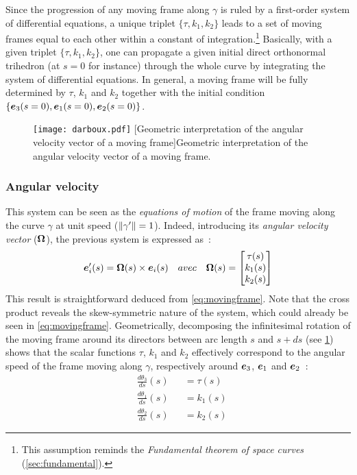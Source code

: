 Since the progression of any moving frame along $\gamma$ is ruled by a first-order system of differential equations, a unique triplet $\{\tau, k_{1}, k_{2}\}$ leads to a set of moving frames equal to each other within a constant of integration.\footnote{This assumption reminds the \emph{Fundamental theorem of space curves} (\cref{sec:fundamental}).} Basically, with a given triplet $\{\tau, k_{1}, k_{2}\}$, one can propagate a given initial direct orthonormal trihedron (at $s=0$ for instance) through the whole curve by integrating the system of differential equations. In general, a moving frame will be fully determined by $\tau$, $k_{1}$ and $k_{2}$ together with the initial condition $\{\boldsymbol{e}_{3}(s=0),\boldsymbol{e}_{1}(s=0),\boldsymbol{e}_{2}(s=0)\}$.

\begin{figure}[t]
\centering
\texttt{[image: darboux.pdf]}
[Geometric interpretation of the angular velocity vector of a moving frame]{Geometric interpretation of the angular velocity vector of a moving frame.}
\label{fig:geo_interpretation}
\end{figure}

\subsubsection{Angular velocity}
This system can be seen as the \emph{equations of motion} of the frame moving along the curve $\gamma$ at unit speed ($\lVert\gamma'\rVert=1$). Indeed, introducing its \emph{angular velocity vector} ($\boldsymbol{\Omega}$), the previous system is expressed as~:
\begin{equation}
	\boldsymbol{e}'_{i}(s) = \boldsymbol{\Omega}(s) \times \boldsymbol{e}_{i}(s)
	\quad avec \quad
	\boldsymbol{\Omega}(s)
	=
	\begin{bmatrix}
		\tau(s) \\
		k_1(s) \\
		k_2(s)
	\end{bmatrix}
\end{equation}
This result is straightforward deduced from \cref{eq:movingframe}. Note that the cross product reveals the skew-symmetric nature of the system, which could already be seen in \cref{eq:movingframe}.
Geometrically, decomposing the infinitesimal rotation of the moving frame around its directors between arc length $s$ and $s+ds$ (see \cref{fig:geo_interpretation}) shows that the scalar functions $\tau$, $k_{1}$ and $k_{2}$ effectively correspond to the angular speed of the frame moving along $\gamma$, respectively around $\boldsymbol{e}_{3}$, $\boldsymbol{e}_{1}$ and $\boldsymbol{e}_{2}$~:
\begin{subequations}
	\begin{alignat}{2}
		&\frac{d\theta_3}{ds}(s) &&= \tau(s)
		\\[0.5em]
		&\frac{d\theta_1}{ds}(s) &&= k_{1}(s)
		\\[0.5em]
		&\frac{d\theta_2}{ds}(s) &&= k_{2}(s)
	\end{alignat}
\end{subequations}

